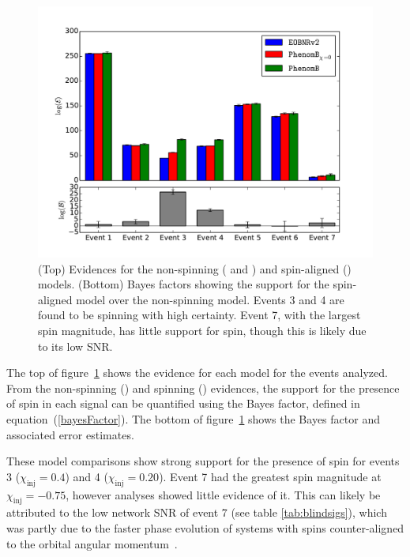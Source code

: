 \begin{figure}[t]
  \includegraphics[scale=.6]{papers/mdc2013_submission/figure9}
  \caption{\label{fig:PE_modelComp} (Top) Evidences for the non-spinning (\eob
     and \imrns) and spin-aligned (\imr) models. (Bottom) Bayes factors showing
     the support for the spin-aligned model over the non-spinning \imrns model.
     Events 3 and 4 are found to be spinning with high certainty.  Event 7, with
     the largest spin magnitude, has little support for spin, though this 
     is likely due to its low SNR.}
\end{figure}

The top of figure~\ref{fig:PE_modelComp} shows the evidence for each model for
the events analyzed.  From the non-spinning (\imrns) and spinning (\imr)
evidences, the support for the presence of spin in each signal can be
quantified using the Bayes factor, defined in equation~(\ref{bayesFactor}).  
The bottom of figure~\ref{fig:PE_modelComp} shows the Bayes factor and 
associated error estimates.

These model comparisons show strong support for the presence of spin for events
3 ($\chi_\text{inj}=0.4$) and 4 ($\chi_\text{inj}=0.20$).  Event 7 had the
greatest spin magnitude at $\chi_\text{inj}=-0.75$, however analyses showed
little evidence of it.  This can likely be attributed to the low network SNR of
event 7 (see table \ref{tab:blindsigs}), which was partly due to the faster
phase evolution of systems with spins counter-aligned to the orbital angular
momentum~\cite{Campanelli:2006uy}.

